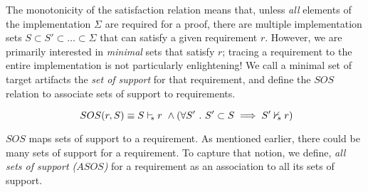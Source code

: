 





The monotonicity of the satisfaction relation means that, unless {\em all} elements of the implementation $\Sigma$ are required for a proof, there are multiple implementation sets $S \subset S' \subset \ldots \subset \Sigma$ that can satisfy a given requirement $r$.  However, we are primarily interested in {\em minimal} sets that satisfy $r$; tracing a requirement to the entire implementation is not particularly enlightening!  We call a minimal set of target artifacts the \emph{set of support} for that requirement, and define the $SOS$ relation to associate sets of support to requirements.

$$ \ SOS(r, S) \equiv S \vdash_{\!\!s} r~\land (\forall S'\ .\ S' \subset S \implies S' \nvdash_{\!\!s} r) $$

$SOS$ maps sets of support to a requirement. As mentioned earlier, there could be many sets of support for a requirement. To capture that notion, we define, \emph{all sets of support ($ASOS$)} for a requirement as an association to all its sets of support.

